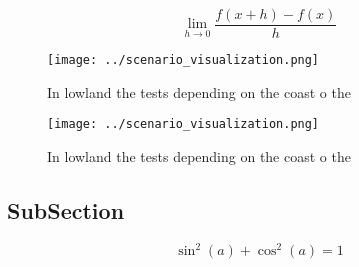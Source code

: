 \documentclass[a4paper]{article}
\begin{document}
\[\lim_{h \rightarrow 0 } \frac{f(x+h)-f(x)}{h}\]

\begin{figure}
\centering
\texttt{[image: ../scenario\_visualization.png]}
\caption{In lowland the tests depending on the coast o the
}
\end{figure}
 
\begin{figure}
\centering
\texttt{[image: ../scenario\_visualization.png]}
\caption{In lowland the tests depending on the coast o the
}
\end{figure}
 
\subsection{SubSection}

\[ \sin^2(a)+\cos^2(a) = 1 \]
\end{document}
